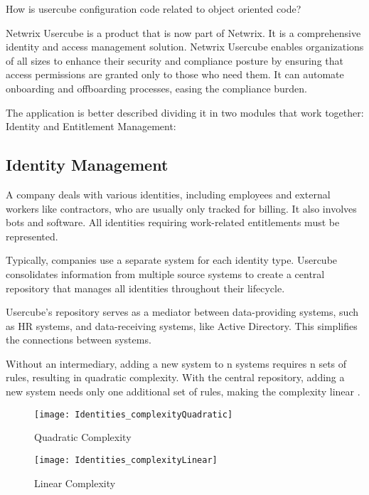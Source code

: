 How is usercube configuration code related to object oriented code?

Netwrix Usercube is a product that is now part of Netwrix. It is a comprehensive identity and access management solution. Netwrix Usercube enables organizations of all sizes to enhance their security and compliance posture by ensuring that access permissions are granted only to those who need them. It can automate onboarding and offboarding processes, easing the compliance burden.  

The application is better described dividing it in two modules that work together: Identity and Entitlement Management:

\subsection{Identity Management}

A company deals with various identities, including employees and external workers like contractors, who are usually only tracked for billing. It also involves bots and software. All identities requiring work-related entitlements must be represented.

Typically, companies use a separate system for each identity type. Usercube consolidates information from multiple source systems to create a central repository that manages all identities throughout their lifecycle.

Usercube's repository serves as a mediator between data-providing systems, such as HR systems, and data-receiving systems, like Active Directory. This simplifies the connections between systems.

Without an intermediary, adding a new system to n systems requires n sets of rules, resulting in quadratic complexity. With the central repository, adding a new system needs only one additional set of rules, making the complexity linear \cite{UsercubeDocument}.

\begin{figure}[htbp]
  \centering
  \begin{minipage}{0.48\textwidth}
    \texttt{[image: Identities\_complexityQuadratic]}
    \caption{Quadratic Complexity}
    \label{fig:Identities_complexityQuadratic}
  \end{minipage}\hfill
  \begin{minipage}{0.48\textwidth}
    \texttt{[image: Identities\_complexityLinear]}
    \caption{Linear Complexity}
    \label{fig:Identities_complexityLinear}
  \end{minipage}
\end{figure}


